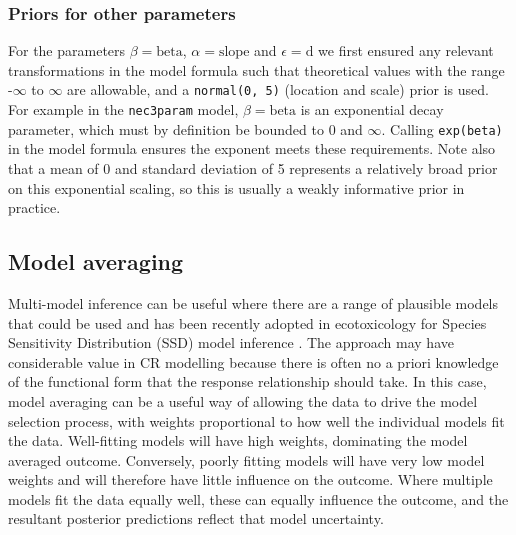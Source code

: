 \documentclass[
  shortnames]{jss}
\begin{document}
\hypertarget{priors-for-other-parameters}{%
\subsubsection{Priors for other parameters}\label{priors-for-other-parameters}}

For the parameters \(\beta = \text{beta}\), \(\alpha = \text{slope}\) and \(\epsilon = \text{d}\) we first ensured any relevant transformations in the model formula such that theoretical values with the range -\(\infty\) to \(\infty\) are allowable, and a \texttt{normal(0,\ 5)} (location and scale) prior is used. For example in the \texttt{nec3param} model, \(\beta = \text{beta}\) is an exponential decay parameter, which must by definition be bounded to 0 and \(\infty\). Calling \texttt{exp(beta)} in the model formula ensures the exponent meets these requirements. Note also that a mean of 0 and standard deviation of 5 represents a relatively broad prior on this exponential scaling, so this is usually a weakly informative prior in practice.

\newpage

\subsection[Model averaging]{Model averaging}\label{modavg}

Multi-model inference can be useful where there are a range of plausible models that could be used \citep{Burnham2002} and has been recently adopted in ecotoxicology for Species Sensitivity Distribution (SSD) model inference \citep{Thorley2018, fox2020, Dalgarno}. The approach may have considerable value in CR modelling because there is often no a priori knowledge of the functional form that the response relationship should take. In this case, model averaging can be a useful way of allowing the data to drive the model selection process, with weights proportional to how well the individual models fit the data. Well-fitting models will have high weights, dominating the model averaged outcome. Conversely, poorly fitting models will have very low model weights and will therefore have little influence on the outcome. Where multiple models fit the data equally well, these can equally influence the outcome, and the resultant posterior predictions reflect that model uncertainty.
\end{document}
